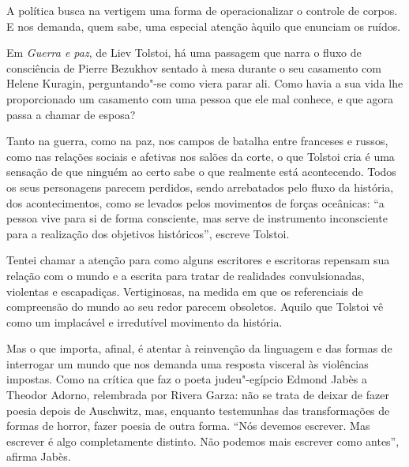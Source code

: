 A política busca na vertigem uma forma de operacionalizar o controle de
corpos. E nos demanda, quem sabe, uma especial atenção àquilo que
enunciam os ruídos.

\asterisc

Em \emph{Guerra e paz}, de Liev Tolstoi, há uma passagem que narra o fluxo de
consciência de Pierre Bezukhov sentado à mesa durante o seu casamento
com Helene Kuragin, perguntando"-se como viera parar ali. Como havia a sua
vida lhe proporcionado um casamento com uma pessoa que ele mal conhece,
e que agora passa a chamar de esposa?

Tanto na guerra, como na paz, nos
campos de batalha entre franceses e russos, como nas relações sociais e
afetivas nos salões da corte, o que Tolstoi cria é uma sensação de que
ninguém ao certo sabe o que realmente está acontecendo. Todos os seus
personagens parecem perdidos, sendo arrebatados pelo fluxo da história,
dos acontecimentos, como se levados pelos movimentos de forças
oceânicas: ``a pessoa vive para si de forma consciente, mas serve de
instrumento inconsciente para a realização dos objetivos históricos'', escreve Tolstoi.

Tentei chamar a atenção para como alguns escritores e
escritoras repensam sua relação com o mundo e a escrita
para tratar de realidades convulsionadas, violentas e escapadiças.
Vertiginosas, na medida em que os referenciais de compreensão do
mundo ao seu redor parecem obsoletos. Aquilo que Tolstoi vê como um
implacável e irredutível movimento da história.


Mas o que importa, afinal, é atentar à reinvenção da linguagem e das
formas de interrogar um mundo que nos demanda uma resposta visceral às
violências impostas. Como na crítica que faz o poeta
judeu"-egípcio Edmond Jabès a Theodor Adorno, relembrada por Rivera
Garza: não se trata de deixar de fazer poesia depois de Auschwitz, mas,
enquanto testemunhas das transformações de formas de horror, fazer
poesia de outra forma. ``Nós devemos escrever. Mas escrever é algo
completamente distinto. Não podemos mais escrever como antes'', afirma
Jabès.


